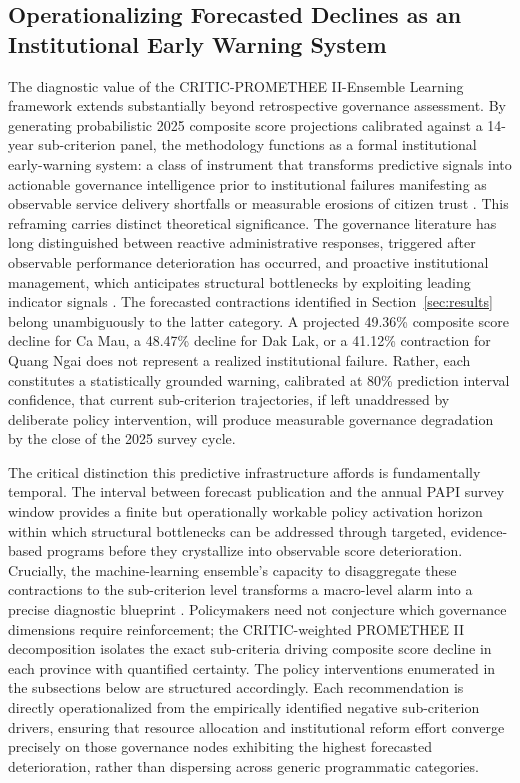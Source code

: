 \documentclass[12pt,a4paper]{article}
\begin{document}
\subsection{Operationalizing Forecasted Declines as an Institutional Early Warning System}
\label{subsec:policy_early_warning}

The diagnostic value of the CRITIC-PROMETHEE II-Ensemble Learning framework extends substantially beyond retrospective governance assessment. By generating probabilistic 2025 composite score projections calibrated against a 14-year sub-criterion panel, the methodology functions as a formal institutional early-warning system: a class of instrument that transforms predictive signals into actionable governance intelligence prior to institutional failures manifesting as observable service delivery shortfalls or measurable erosions of citizen trust \citep{Maffei2020, Athey2017}. This reframing carries distinct theoretical significance. The governance literature has long distinguished between reactive administrative responses, triggered after observable performance deterioration has occurred, and proactive institutional management, which anticipates structural bottlenecks by exploiting leading indicator signals \citep{Kaufmann2011, Knack1995}. The forecasted contractions identified in Section~\ref{sec:results} belong unambiguously to the latter category. A projected 49.36\% composite score decline for Ca Mau, a 48.47\% decline for Dak Lak, or a 41.12\% contraction for Quang Ngai does not represent a realized institutional failure. Rather, each constitutes a statistically grounded warning, calibrated at 80\% prediction interval confidence, that current sub-criterion trajectories, if left unaddressed by deliberate policy intervention, will produce measurable governance degradation by the close of the 2025 survey cycle.

The critical distinction this predictive infrastructure affords is fundamentally temporal. The interval between forecast publication and the annual PAPI survey window provides a finite but operationally workable policy activation horizon within which structural bottlenecks can be addressed through targeted, evidence-based programs before they crystallize into observable score deterioration. Crucially, the machine-learning ensemble's capacity to disaggregate these contractions to the sub-criterion level transforms a macro-level alarm into a precise diagnostic blueprint \citep{Williamson2016}. Policymakers need not conjecture which governance dimensions require reinforcement; the CRITIC-weighted PROMETHEE II decomposition isolates the exact sub-criteria driving composite score decline in each province with quantified certainty. The policy interventions enumerated in the subsections below are structured accordingly. Each recommendation is directly operationalized from the empirically identified negative sub-criterion drivers, ensuring that resource allocation and institutional reform effort converge precisely on those governance nodes exhibiting the highest forecasted deterioration, rather than dispersing across generic programmatic categories.
\end{document}
